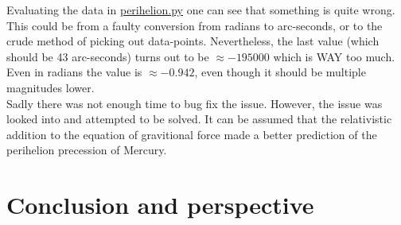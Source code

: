 \documentclass{article}
\begin{document}
    Evaluating the data in \href{https://github.com/Erikbgram/Fys3150/blob/master/Project\%205/program/perihelion.py}{perihelion.py} one can see that something is quite wrong. This could be from a faulty conversion from radians to arc-seconds, or to the crude method of picking out data-points. Nevertheless, the last value (which should be 43 arc-seconds) turns out to be $\approx-195000$ which is WAY too much. Even in radians the value is $\approx-0.942$, even though it should be multiple magnitudes lower.\\

    Sadly there was not enough time to bug fix the issue. However, the issue was looked into and attempted to be solved. It can be assumed that the relativistic addition to the equation of gravitional force made a better prediction of the perihelion precession of Mercury.

\vspace{1cm}

\section{Conclusion and perspective} \label{sec:Conclusion}

\end{document}
